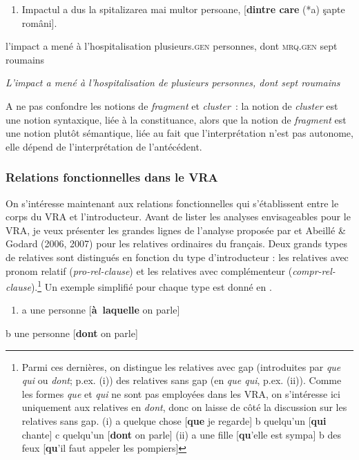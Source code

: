 \begin{enumerate}
\item   \label{bkm:Ref298953416}Impactul a dus la spitalizarea mai multor persoane, [\textbf{dintre care} (*a) şapte români]. 


\end{enumerate}
l'impact a mené à l'hospitalisation plusieurs\textsc{.gen} personnes, dont \textsc{mrq.gen} sept roumains 

{\itshape
L'impact a mené à l'hospitalisation de plusieurs personnes, dont sept roumains } 

A ne pas confondre les notions de \textit{fragment} et \textit{cluster~}: la notion de \textit{cluster} est une notion syntaxique, liée à la constituance, alors que la notion de \textit{fragment} est une notion plutôt sémantique, liée au fait que l'interprétation n'est pas autonome, elle dépend de l'interprétation de l'antécédent.

\subsubsection{Relations fonctionnelles dans le VRA}
On s'intéresse maintenant aux relations fonctionnelles qui s'établissent entre le corps du VRA et l'introducteur. Avant de lister les analyses envisageables pour le VRA, je veux présenter les grandes lignes de l'analyse proposée par \citet{Godard1988} et Abeillé \& Godard (2006, 2007) pour les relatives ordinaires du français. Deux grands types de relatives sont distingués en fonction du type d'introducteur : les relatives avec pronom relatif (\textit{pro-rel-clause}) et les relatives avec complémenteur (\textit{compr-rel-clause}).\footnote{Parmi ces dernières, on distingue les relatives avec gap (introduites par \textit{que {\textbar} qui} ou \textit{dont}; p.ex. (i)) des relatives sans gap (en \textit{que {\textbar} qui}, p.ex. (ii)). Comme les formes \textit{que} et\textit{ qui} ne sont pas employées dans les VRA, on s'intéresse ici uniquement aux relatives en \textit{dont}, donc on laisse de côté la discussion sur les relatives sans gap.
(i)  a  quelque chose [\textbf{que} je regarde]
  b  quelqu'un [\textbf{qui} chante]
  c  quelqu'un [\textbf{dont} on parle]
(ii)  a  une fille [\textbf{qu}'elle est sympa]
  b  des feux [\textbf{qu}'il faut appeler les pompiers]} Un exemple simplifié pour chaque type est donné en . 


\begin{enumerate}
\item \label{bkm:Ref298794950}a  une personne [\textbf{à~laquelle} on parle] 


\end{enumerate}
  b  une personne [\textbf{dont} on parle] 

